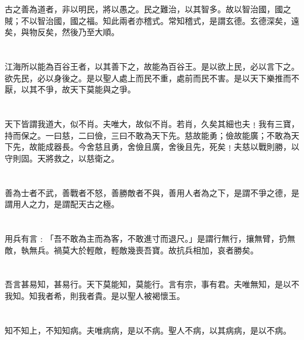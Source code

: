 \documentclass[11pt,oneside]{article}
\begin{document}
\section{}
\label{sec:orgheadline64}
古之善為道者，非以明民，將以愚之。民之難治，以其智多。故以智治國，國之賊；不以智治國，國之福。知此兩者亦稽式。常知稽式，是謂玄德。玄德深矣，遠矣，與物反矣，然後乃至大順。

\section{}
\label{sec:orgheadline65}
江海所以能為百谷王者，以其善下之，故能為百谷王。是以欲上民，必以言下之。欲先民，必以身後之。是以聖人處上而民不重，處前而民不害。是以天下樂推而不厭，以其不爭，故天下莫能與之爭。

\section{}
\label{sec:orgheadline66}
天下皆謂我道大，似不肖。夫唯大，故似不肖。若肖，久矣其細也夫﹗我有三寶，持而保之。一曰慈，二曰儉，三曰不敢為天下先。慈故能勇；儉故能廣；不敢為天下先，故能成器長。今舍慈且勇，舍儉且廣，舍後且先，死矣﹗夫慈以戰則勝，以守則固。天將救之，以慈衛之。

\section{}
\label{sec:orgheadline67}
善為士者不武，善戰者不怒，善勝敵者不與，善用人者為之下，是謂不爭之德，是謂用人之力，是謂配天古之極。

\section{}
\label{sec:orgheadline68}
用兵有言﹕「吾不敢為主而為客，不敢進寸而退尺。」是謂行無行，攘無臂，扔無敵，執無兵。禍莫大於輕敵，輕敵幾喪吾寶。故抗兵相加，哀者勝矣。

\section{}
\label{sec:orgheadline69}
吾言甚易知，甚易行。天下莫能知，莫能行。言有宗，事有君。夫唯無知，是以不我知。知我者希，則我者貴。是以聖人被褐懷玉。

\section{}
\label{sec:orgheadline70}
知不知上，不知知病。夫唯病病，是以不病。聖人不病，以其病病，是以不病。
\end{document}
